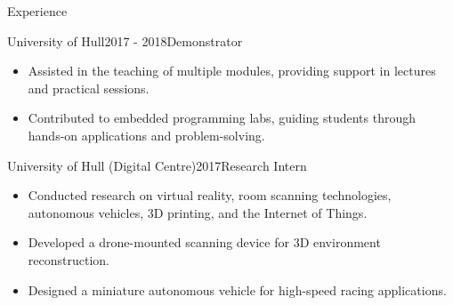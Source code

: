 \documentclass{cv}
\begin{document}
\begin{rSection}{Experience}
        \item \begin{rSubsection}{University of Hull}{2017 - 2018}{Demonstrator}{}
            \item \begin{itemize}
                \item Assisted in the teaching of multiple modules, providing support in lectures and practical sessions.
                \item Contributed to embedded programming labs, guiding students through hands-on applications and problem-solving.
            \end{itemize}
        \end{rSubsection}
        
        \item \begin{rSubsection}{University of Hull (Digital Centre)}{2017}{Research Intern}{}
            \item \begin{itemize}
                \item Conducted research on virtual reality, room scanning technologies, autonomous vehicles, 3D printing, and the Internet of Things.
                \item Developed a drone-mounted scanning device for 3D environment reconstruction.
                \item Designed a miniature autonomous vehicle for high-speed racing applications.
            \end{itemize}
        \end{rSubsection}
    \end{rSection}
    
\end{document}
